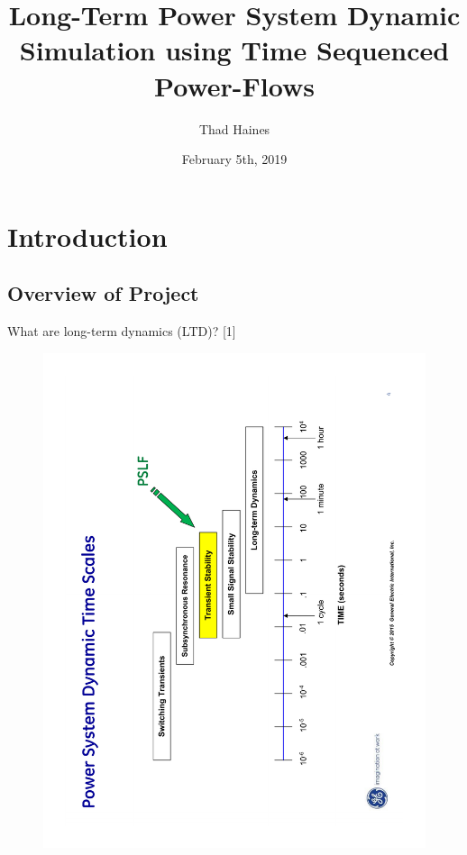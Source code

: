 \documentclass[14pt, unknownkeysallowed]{beamer}
\title{Long-Term Power System Dynamic Simulation using Time Sequenced Power-Flows}
\author{Thad Haines}
\institute[MT TECH]{Montana Tech - Master's Thesis Research Project}
\date{February 5th, 2019}
\begin{document}
\begin{frame}
\titlepage
\end{frame}

\section{Introduction}
\subsection{Overview of Project}
\begin{frame}
What are long-term dynamics (LTD)? \tiny[1] \vspace{-2em}\\
\begin{figure}
	\includegraphics[angle=-90,origin=c,width=1.05\linewidth]{GEtimeScales} 
\end{figure}
\end{frame}
\end{document}
